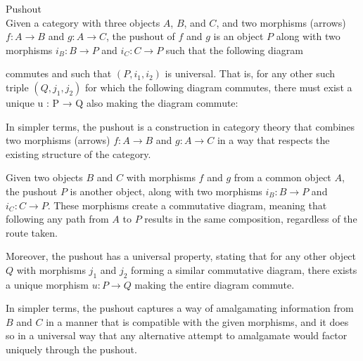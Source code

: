 \begin{definition}{Pushout}\\
Given a category with three objects \(A\), \(B\), and \(C\), and two morphisms (arrows) \(f: A \to B\) and \(g: A \to C\), the pushout of \(f\) and \(g\) is an object \(P\) along with two morphisms \(i_B: B \to P\) and \(i_C: C \to P\) such that the following diagram 
\begin{center}
\end{center}
commutes and such that $(P, i_1, i_2)$ is universal. That is, for any other such triple $(Q, j_1, j_2)$ for which the following diagram commutes, there must exist a unique u : P → Q also making the diagram commute:
\begin{center}
\end{center}
In simpler terms, the pushout is a construction in category theory that combines two morphisms (arrows) \(f: A \to B\) and \(g: A \to C\) in a way that respects the existing structure of the category.

Given two objects \(B\) and \(C\) with morphisms \(f\) and \(g\) from a common object \(A\), the pushout \(P\) is another object, along with two morphisms \(i_B: B \to P\) and \(i_C: C \to P\). These morphisms create a commutative diagram, meaning that following any path from \(A\) to \(P\) results in the same composition, regardless of the route taken.

Moreover, the pushout has a universal property, stating that for any other object \(Q\) with morphisms \(j_1\) and \(j_2\) forming a similar commutative diagram, there exists a unique morphism \(u: P \to Q\) making the entire diagram commute.

In simpler terms, the pushout captures a way of amalgamating information from \(B\) and \(C\) in a manner that is compatible with the given morphisms, and it does so in a universal way that any alternative attempt to amalgamate would factor uniquely through the pushout.
\end{definition}\\

